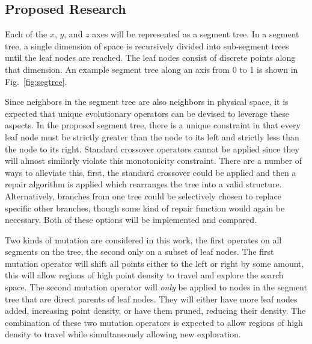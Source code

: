 \documentclass{article}
\begin{document}
\subsection{Proposed Research}\label{sec:b3}
Each of the $x$, $y$, and $z$ axes will be represented as a segment tree. In a segment tree, a single dimension of space is recursively divided into sub-segment trees until the leaf nodes are reached. The leaf nodes consist of discrete points along that dimension. An example segment tree along an axis from 0 to 1 is shown in Fig.~\ref{fig:segtree}.

Since neighbors in the segment tree are also neighbors in physical space, it is expected that unique evolutionary operators can be devised to leverage these aspects. In the proposed segment tree, there is a unique constraint in that every leaf node must be strictly greater than the node to its left and strictly less than the node to its right. Standard crossover operators cannot be applied since they will almost similarly violate this monotonicity constraint. There are a number of ways to alleviate this, first, the standard crossover could be applied and then a repair algorithm is applied which rearranges the tree into a valid structure. Alternatively, branches from one tree could be selectively chosen to replace specific other branches, though some kind of repair function would again be necessary. Both of these options will be implemented and compared.

Two kinds of mutation are considered in this work, the first operates on all segments on the tree, the second only on a subset of leaf nodes. The first mutation operator will shift all points either to the left or right by some amount, this will allow regions of high point density to travel and explore the search space. The second mutation operator will \textit{only} be applied to nodes in the segment tree that are direct parents of leaf nodes. They will either have more leaf nodes added, increasing point density, or have them pruned, reducing their density. The combination of these two mutation operators is expected to allow regions of high density to travel while simultaneously allowing new exploration.
\end{document}
